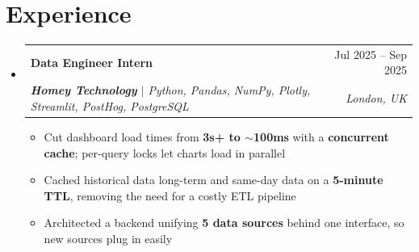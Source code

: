 \documentclass[letterpaper,10pt]{article}
\makeatletter
\newcommand{\resumeItem}[1]{
  \item\small{
    {#1 \vspace{-2pt}}
  }
}
\newcommand{\resumeSubheading}[4]{
  \vspace{-2pt}\item
    \begin{tabular*}{0.97\textwidth}[t]{l@{\extracolsep{\fill}}r}
      \textbf{#1} & #2 \\
      \textit{\small#3} & \textit{\small #4} \\
    \end{tabular*}\vspace{-7pt}
}
\newcommand{\resumeSubHeadingListStart}{\begin{itemize}[leftmargin=0.15in, label={}]}
\newcommand{\resumeSubHeadingListEnd}{\end{itemize}}
\newcommand{\resumeItemListStart}{\begin{itemize}}
\newcommand{\resumeItemListEnd}{\end{itemize}\vspace{-5pt}}
\makeatother
\begin{document}
\section{Experience}
  \resumeSubHeadingListStart
  \resumeSubheading
      {Data Engineer Intern}{Jul 2025 -- Sep 2025}
      {\textbf{Homey Technology} $|$ Python, Pandas, NumPy, Plotly, Streamlit, PostHog, PostgreSQL}{London, UK}
        \resumeItemListStart
          \resumeItem{Cut dashboard load times from \textbf{3s+ to $\sim$100ms} with a \textbf{concurrent cache}; per-query locks let charts load in parallel}
          \resumeItem{Cached historical data long-term and same-day data on a \textbf{5-minute TTL}, removing the need for a costly ETL pipeline}
          \resumeItem{Architected a backend unifying \textbf{5 data sources} behind one interface, so new sources plug in easily}
        \resumeItemListEnd
  \resumeSubHeadingListEnd


\end{document}
